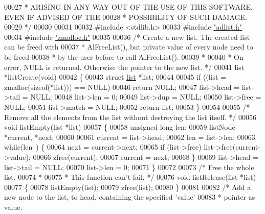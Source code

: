 \begin{DoxyCode}
00027 \textcolor{comment}{ * ARISING IN ANY WAY OUT OF THE USE OF THIS SOFTWARE, EVEN IF ADVISED OF THE}
00028 \textcolor{comment}{ * POSSIBILITY OF SUCH DAMAGE.}
00029 \textcolor{comment}{ */}
00030 
00031 
00032 \textcolor{preprocessor}{#}\textcolor{preprocessor}{include} \textcolor{preprocessor}{<}\textcolor{preprocessor}{stdlib}\textcolor{preprocessor}{.}\textcolor{preprocessor}{h}\textcolor{preprocessor}{>}
00033 \textcolor{preprocessor}{#}\textcolor{preprocessor}{include} \hyperlink{adlist_8h}{"adlist.h"}
00034 \textcolor{preprocessor}{#}\textcolor{preprocessor}{include} \hyperlink{zmalloc_8h}{"zmalloc.h"}
00035 
00036 \textcolor{comment}{/* Create a new list. The created list can be freed with}
00037 \textcolor{comment}{ * AlFreeList(), but private value of every node need to be freed}
00038 \textcolor{comment}{ * by the user before to call AlFreeList().}
00039 \textcolor{comment}{ *}
00040 \textcolor{comment}{ * On error, NULL is returned. Otherwise the pointer to the new list. */}
00041 list *listCreate(\textcolor{keywordtype}{void})
00042 \{
00043     \textcolor{keyword}{struct} \hyperlink{structlist}{list} *list;
00044 
00045     \textcolor{keywordflow}{if} ((list = zmalloc(\textcolor{keyword}{sizeof}(*list))) == NULL)
00046         \textcolor{keywordflow}{return} NULL;
00047     list->head = list->tail = NULL;
00048     list->len = 0;
00049     list->dup = NULL;
00050     list->free = NULL;
00051     list->match = NULL;
00052     \textcolor{keywordflow}{return} list;
00053 \}
00054 
00055 \textcolor{comment}{/* Remove all the elements from the list without destroying the list itself. */}
00056 \textcolor{keywordtype}{void} listEmpty(list *list)
00057 \{
00058     \textcolor{keywordtype}{unsigned} \textcolor{keywordtype}{long} len;
00059     listNode *current, *next;
00060 
00061     current = list->head;
00062     len = list->len;
00063     \textcolor{keywordflow}{while}(len--) \{
00064         next = current->next;
00065         \textcolor{keywordflow}{if} (list->free) list->free(current->value);
00066         zfree(current);
00067         current = next;
00068     \}
00069     list->head = list->tail = NULL;
00070     list->len = 0;
00071 \}
00072 
00073 \textcolor{comment}{/* Free the whole list.}
00074 \textcolor{comment}{ *}
00075 \textcolor{comment}{ * This function can't fail. */}
00076 \textcolor{keywordtype}{void} listRelease(list *list)
00077 \{
00078     listEmpty(list);
00079     zfree(list);
00080 \}
00081 
00082 \textcolor{comment}{/* Add a new node to the list, to head, containing the specified 'value'}
00083 \textcolor{comment}{ * pointer as value.}

\end{DoxyCode}
